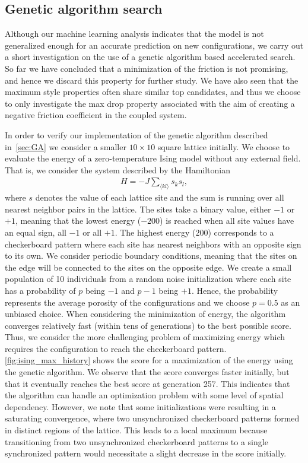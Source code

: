 \subsection{Genetic algorithm search}
Although our machine learning analysis indicates that the model is not generalized enough for an accurate prediction on new configurations, we carry out a short investigation on the use of a genetic algorithm based accelerated search. So far we have concluded that a minimization of the friction is not
promising, and hence we discard this property for further study. We have also
seen that the maximum style properties often share similar top candidates, and
thus we choose to only investigate the max drop property associated with the
aim of creating a negative friction coefficient in the coupled system. 

In order to verify our implementation of the genetic algorithm described
in~\cref{sec:GA} we consider a smaller $10 \times 10$ square lattice initially. We choose to
evaluate the energy of a zero-temperature Ising model without any external
field. That is, we consider the system described by the Hamiltonian 
\begin{align}
  H = -J\sum_{\langle kl \rangle} s_k s_l,
  \label{eq:H_ising}
\end{align}
where $s$ denotes the value of each lattice site and the sum is running over all
nearest neighbor pairs in the lattice. The sites take a binary value, either
$-1$ or $+1$, meaning that the lowest energy ($-200$) is reached when all site values have an equal sign, all $-1$ or all $+1$. The highest energy ($200$) corresponds to a checkerboard pattern where each site has nearest neighbors with an opposite sign to its own. We consider periodic boundary conditions, meaning that the sites on
the edge will be connected to the sites on the opposite edge. We create a small
population of 10 individuals from a random noise initialization where each site
has a probability of $p$ being $-1$ and $p-1$ being $+1$. Hence, the probability
represents the average porosity of the configurations and we choose $p = 0.5$ as an unbiased choice. When
considering the minimization of energy, the algorithm converges relatively fast (within tens of generations) to the best possible score. Thus, we consider the more challenging problem of maximizing energy which requires the configuration to reach the checkerboard pattern. \cref{fig:ising_max_history} shows the score for a maximization of the energy using the genetic algorithm. We observe that the score converges faster initially, but that it eventually reaches the best score at generation 257. This indicates that the algorithm can handle an optimization problem with some level of spatial dependency. However, we note that some initializations were resulting in a saturating convergence, where two unsynchronized checkerboard patterns formed in distinct regions of the lattice. This leads to a local maximum because transitioning from two unsynchronized checkerboard patterns to a single synchronized pattern would necessitate a slight decrease in the score initially.

